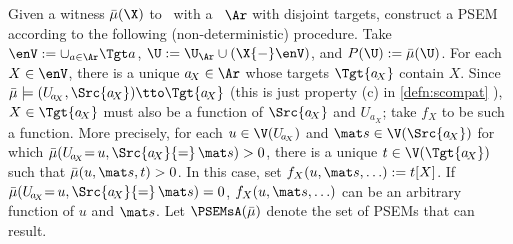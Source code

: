 
\begin{constr}
        \label{constr:PSEMs}
    Given a witness $\bar\mu(\X)$ to \cibility\ with
    a \hgraph\ $\Ar$ with disjoint targets,
    construct a PSEM according to the 
    following (non-deterministic) procedure.  
    Take $\enV := \cup_{a \in \Ar} \Tgt a$,  $\U := \U_{\Ar} \cup (\X{-}\enV)$, and $P(\U) := \bar\mu(\U)$. 
For each $X \in \enV$, there is a unique $a_{\!X} \in \Ar$ whose targets $\Tgt {a_{\!X}}$ contain $X$. 
Since
$\bar\mu \models ( U_{\!a_{\!X}}, \Src{a_{\!X}}) \tto \Tgt {a_{\!X}}$ 
(this is just property (c) in
\cref{defn:scompat}%
 ),
$X \in \Tgt {a_{\!X}}$ must also be 
a function of $\Src{a_{\!X}}$ and $U_{\!a_{\!X}}$;
take $f_X$ to be such a function. 
More precisely,
for each $u \in \V (U_{\!a_{\!X}})$ and $\mat s \in \V (\Src {a_{\!X}})$
for which $\bar\mu(U_{\!a_{\!X}} {=}\, u, \Src {a_{\!X}} {=}\, \mat s) > 0$,
there is a unique
$t \in \V (\Tgt {a_{\!X}})$ such that $\bar\mu(u,\mat s, t) > 0$.
In this case, set $f_X(u, \mat s, \ldots) := t[X]$.
If $\bar\mu(U_{\!a_{\!X}} {=}\, u, \Src {a_{\!X}} {=}\, \mat s) = 0$, 
$f_X(u, \mat s, \ldots)$ can be an arbitrary function of $u$ and $\mat s$.
Let $\PSEMsA(\bar\mu)$ denote the set of PSEMs that can result.
\end{constr}

